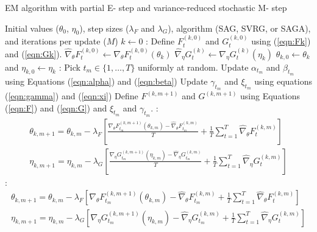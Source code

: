 \begin{algorithm}
\caption{EM algorithm with partial E- step and variance-reduced stochastic M- step}\label{alg:P-EM-SO}
\begin{algorithmic}[1]
\Require Initial values ($\theta_{0}$, $\eta_{0}$), step sizes ($\lambda_F$ and $\lambda_G$), algorithm (SAG, SVRG, or SAGA), and iterations per update ($M$)
%
\State $k \leftarrow 0$
%
:
    \State Define $F_t^{(k,0)}$ and $G_t^{(k,0)}$ using (\ref{eqn:Fk}) and (\ref{eqn:Gk}). 
    \State $\widehat \nabla_\theta F_t^{(k,0)} \leftarrow \nabla_\theta F_t^{(k,0)} (\theta_k)$
    \State $\widehat \nabla_\eta G_t^{(k)} \leftarrow \nabla_\eta G_t^{(k)} (\eta_k)$ 
\EndFor
%
\State $\theta_{k,0} \leftarrow \theta_k$ and $\eta_{k,0} \leftarrow \eta_k$
%
:
    \State Pick $t_m \in \{1,\ldots,T\}$ uniformly at random.
    \State Update $\alpha_{t_m}$ and $\beta_{t_m}$ using Equations (\ref{eqn:alpha}) and (\ref{eqn:beta})
    \State Update $\gamma_{t_m}$ and $\xi_{t_m}$ using equations (\ref{eqn:gamma}) and (\ref{eqn:xi})
    \State Define $F^{(k,m+1)}$ and $G^{(k,m+1)}$ using Equations (\ref{eqn:F}) and (\ref{eqn:G}) and $\xi_{t_m}$ and $\gamma_{t_m}$.
    :
        \begin{gather}
            \theta_{k,m+1} = \theta_{k,m} - \lambda_F \left[\frac{\nabla_\theta F_{t_m}^{(k,m+1)}(\theta_{k,m}) - \widehat \nabla_\theta F_{t_m}^{(k,m)}}{T} + \frac{1}{T} \sum_{t=1}^T \widehat \nabla_\theta F^{(k,m)}_{t} \right] \\
            \eta_{k,m+1} = \eta_{k,m} - \lambda_G \left[\frac{\nabla_\eta G_{t_m}^{(k,m+1)}(\eta_{k,m}) - \widehat \nabla_\eta G_{t_m}^{(k,m)}}{T} + \frac{1}{T} \sum_{t=1}^T \widehat \nabla_\eta G^{(k,m)}_{t} \right]
        \end{gather}
    :
        \begin{gather}
            \theta_{k,m+1} = \theta_{k,m} - \lambda_F \left[\nabla_\theta F_{t_m}^{(k,m+1)}(\theta_{k,m}) - \widehat \nabla_\theta F_{t_m}^{(k,m)} + \frac{1}{T} \sum_{t=1}^T \widehat \nabla_\theta F^{(k,m)}_{t} \right] \\
            \eta_{k,m+1} = \eta_{k,m} - \lambda_G \left[\nabla_\eta G_{t_m}^{(k,m+1)}(\eta_{k,m}) - \widehat \nabla_\eta G_{t_m}^{(k,m)} + \frac{1}{T} \sum_{t=1}^T \widehat \nabla_\eta G^{(k,m)}_{t} \right]

\end{gather}
\end{algorithmic}
\end{algorithm}
